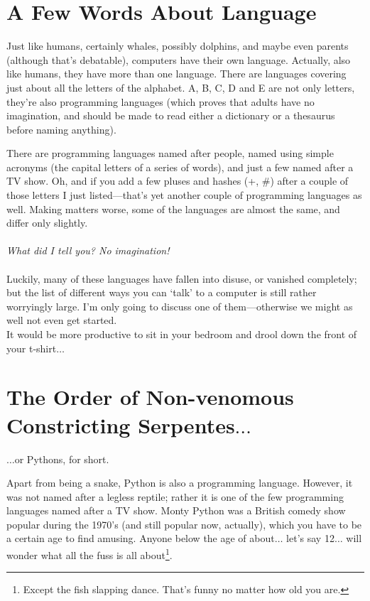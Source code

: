 \section{A Few Words About Language}

Just like humans, certainly whales, possibly dolphins, and maybe even parents (although that's debatable), computers have their own language.  Actually, also like humans, they have more than one language.  There are languages covering just about all the letters of the alphabet.  A, B, C, D and E are not only letters, they're also programming languages (which proves that adults have no imagination, and should be made to read either a dictionary or a thesaurus before naming anything).

There are programming languages named after people, named using simple acronyms (the capital letters of a series of words), and just a few named after a TV show.  Oh, and if you add a few pluses and hashes (+, \#) after a couple of those letters I just listed---that's yet another couple of programming languages as well.  Making matters worse, some of the languages are almost the same, and differ only slightly.
\\
\\
\emph{What did I tell you?  No imagination!}
\\
\\
Luckily, many of these languages have fallen into disuse, or vanished completely; but the list of different ways you can `talk' to a computer is still rather worryingly large.  I'm only going to discuss one of them---otherwise we might as well not even get started.
\\
It would be more productive to sit in your bedroom and drool down the front of your t-shirt$\ldots$

\section{The Order of Non-venomous\\Constricting Serpentes$\ldots$}

$\ldots$or Pythons, for short.

Apart from being a snake, Python is also a programming language.  However, it was not named after a legless reptile; rather it is one of the few programming languages named after a TV show.  Monty Python was a British comedy show popular during the 1970's (and still popular now, actually), which you have to be a certain age to find amusing.  Anyone below the age of about$\ldots$ let's say 12$\ldots$ will wonder what all the fuss is all about\footnote{Except the fish slapping dance.  That's funny no matter how old you are.}.

